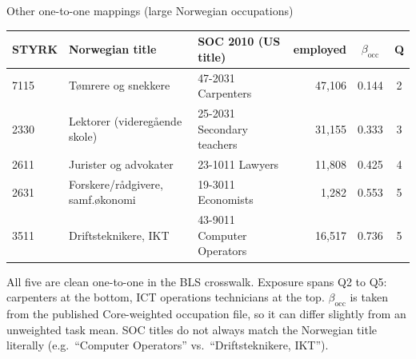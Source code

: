
\begin{frame}{Other one-to-one mappings (large Norwegian occupations)}
\centering\footnotesize
\setlength{\tabcolsep}{4pt}
\begin{tabular}{llp{4.4cm}rcc}
\toprule
STYRK & Norwegian title & SOC 2010 (US title) & employed & $\beta_{\text{occ}}$ & Q \\
\midrule
7115 & Tømrere og snekkere               & 47-2031 Carpenters                  & 47{,}106 & 0.144 & 2 \\
2330 & Lektorer (videregående skole)     & 25-2031 Secondary teachers          & 31{,}155 & 0.333 & 3 \\
2611 & Jurister og advokater             & 23-1011 Lawyers                     & 11{,}808 & 0.425 & 4 \\
2631 & Forskere/rådgivere, samf.økonomi  & 19-3011 Economists                  &  1{,}282 & 0.553 & 5 \\
3511 & Driftsteknikere, IKT              & 43-9011 Computer Operators          & 16{,}517 & 0.736 & 5 \\
\bottomrule
\end{tabular}

\vspace{1em}
All five are clean one-to-one in the BLS crosswalk. Exposure spans Q2 to Q5: carpenters at the bottom, ICT operations technicians at the top. $\beta_{\text{occ}}$ is taken from the published Core-weighted occupation file, so it can differ slightly from an unweighted task mean. SOC titles do not always match the Norwegian title literally (e.g.\ ``Computer Operators'' vs.\ ``Driftsteknikere, IKT'').
\end{frame}
